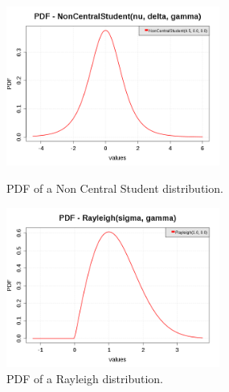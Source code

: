 \begin{figure}[H]
  \begin{minipage}{10cm}
    \begin{center}
      \includegraphics[width=7cm]{pdf_NonCentralStudent.png}
      \caption{PDF of a Non Central Student distribution.}
      \label{PDFNonCentralStudent}
    \end{center}
  \end{minipage}
  \hfill
  \begin{minipage}{10cm}
    \begin{center}
      \includegraphics[width=7cm]{pdf_Rayleigh.png}
      \caption{PDF of a Rayleigh distribution.}
      \label{PDFRayleigh}
    \end{center}
  \end{minipage}
\end{figure}


